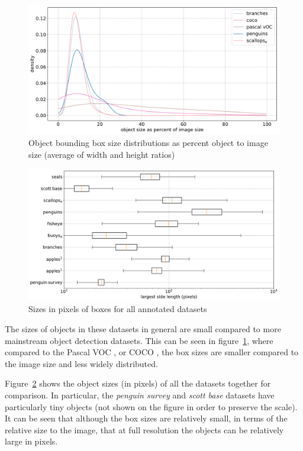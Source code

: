 \begin{figure}[ht]
\centering
\includegraphics[width=1.0\linewidth]{charts/summaries/sizes_density.pdf}
\caption{Object bounding box size distributions as percent object to image size (average of width and height ratios) }
\label{fig:box_sizes}
\end{figure}
 

\begin{figure}[ht]
\centering
\includegraphics[width=1.0\linewidth]{charts/summaries/sizes_boxplot.pdf}
\caption{ Sizes in pixels of boxes for all annotated datasets }
\label{fig:box_sizes_plot}
\end{figure}

The sizes of objects in these datasets in general are small compared to more mainstream object detection datasets. This can be seen in figure~\ref{fig:box_sizes}, where compared to the Pascal VOC \cite{Everingham2008}, or COCO \cite{Lin2014}, the box sizes are smaller compared to the image size and less widely distributed. 

Figure~\ref{fig:box_sizes_plot}  shows the object sizes (in pixels) of all the datasets together for comparison. In particular, the \emph{penguin survey} and \emph{scott base} datasets have particularly tiny objects (not shown on the figure in order to preserve the scale). It can be seen that although the box sizes are relatively small, in terms of the relative size to the image, that at full resolution the objects can be relatively large in pixels.

